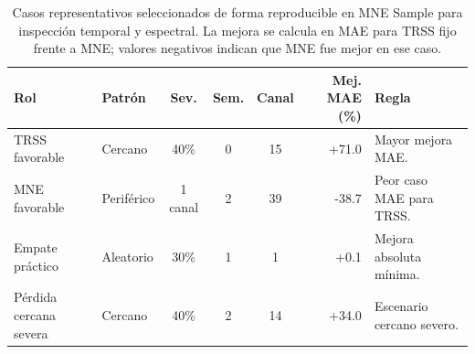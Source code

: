 \begin{table}[htbp]
\centering
\footnotesize
\setlength{\tabcolsep}{3pt}
\caption{Casos representativos seleccionados de forma reproducible en MNE Sample para inspección temporal y espectral. La mejora se calcula en MAE para TRSS fijo frente a MNE; valores negativos indican que MNE fue mejor en ese caso.}
\label{tab:ch4_representative_cases}
\begin{tabular}{@{}>{\raggedright\arraybackslash}p{2.55cm}>{\raggedright\arraybackslash}p{1.65cm}cccr>{\raggedright\arraybackslash}p{2.65cm}@{}}
\toprule
Rol & Patrón & Sev. & Sem. & Canal & Mej. MAE (\%) & Regla \\
\midrule
TRSS favorable & Cercano & 40\% & 0 & 15 & +71.0 & Mayor mejora MAE. \\
MNE favorable & Periférico & 1 canal & 2 & 39 & -38.7 & Peor caso MAE para TRSS. \\
Empate práctico & Aleatorio & 30\% & 1 & 1 & +0.1 & Mejora absoluta mínima. \\
Pérdida cercana severa & Cercano & 40\% & 2 & 14 & +34.0 & Escenario cercano severo. \\
\bottomrule
\end{tabular}
\end{table}
